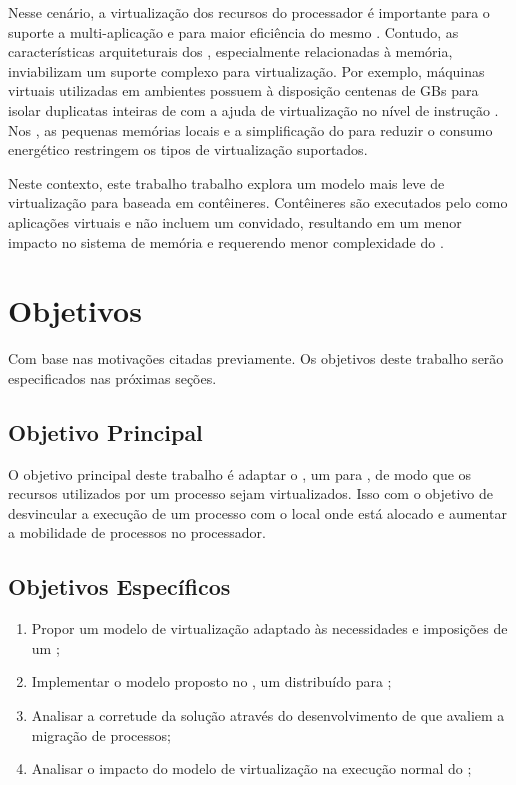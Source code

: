 Nesse cenário, a virtualização dos recursos do processador é importante para o suporte a multi-aplicação e para maior eficiência do mesmo \cite{vanz2022virtualizaccao}. Contudo, as características arquiteturais dos \lws, especialmente relacionadas à memória, inviabilizam um suporte complexo para virtualização. Por exemplo, máquinas virtuais utilizadas em ambientes \cloud possuem à disposição centenas de GBs para isolar duplicatas inteiras de \oss com a ajuda de virtualização no nível de instrução \cite{sharma2016containers}. Nos \lws, as pequenas memórias locais e a simplificação do \hardware para reduzir o consumo energético restringem os tipos de virtualização suportados.

Neste contexto, este trabalho trabalho explora um modelo mais leve de virtualização para \lw baseada em contêineres. Contêineres são executados pelo \os como aplicações virtuais e não incluem um \os convidado, resultando em um menor impacto no sistema de memória e requerendo menor complexidade do \hardware \cite{thalheim2018cntr, sharma2016containers}.

\glsresetall
\section{Objetivos}
\label{sec.goals}

Com base nas motivações citadas previamente. Os objetivos deste trabalho serão especificados nas próximas seções.

\subsection{Objetivo Principal}
\label{sec.goals.primary}

O objetivo principal deste trabalho é adaptar o \nanvix, um \os para \lws, de modo que os recursos utilizados por um processo sejam virtualizados. Isso com o objetivo de desvincular a execução de um processo com o local \ie \cluster onde está alocado e aumentar a mobilidade de processos no processador.

\subsection{Objetivos Específicos}
\label{sec.goals.secondary}

\begin{enumerate}[label= (\roman*)]
    \item Propor um modelo de virtualização adaptado às necessidades e imposições de um \lw;
    \item Implementar o modelo proposto no \nanvix, um \so distribuído para \lws;
    \item Analisar a corretude da solução através do desenvolvimento de \benchmarks que avaliem a migração de processos;
    \item Analisar o impacto do modelo de virtualização na execução normal do \nanvix;
\end{enumerate}

